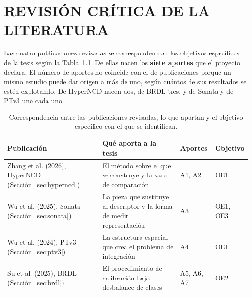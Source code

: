 
\chapter{REVISIÓN CRÍTICA DE LA LITERATURA}
\label{cap:revision}

Las cuatro publicaciones revisadas se corresponden con los objetivos específicos
de la tesis según la Tabla~\ref{tab:mapa-estudios}. De ellas nacen los
\textbf{siete aportes} que el proyecto declara. El número de aportes no coincide
con el de publicaciones porque un mismo estudio puede dar origen a más de uno,
según cuántos de sus resultados se estén explotando. De HyperNCD nacen dos, de
BRDL tres, y de Sonata y de PTv3 uno cada uno.

\begin{table}[!htbp]
\centering
{}\small
\small
\caption[Publicaciones revisadas y su aporte a cada objetivo]{Correspondencia entre las publicaciones revisadas, lo que aportan y el
objetivo específico con el que se identifican.}
\label{tab:mapa-estudios}
\begin{tabularx}{\linewidth}{@{}>{\raggedright\arraybackslash\hsize=0.88\hsize}X>{\raggedright\arraybackslash\hsize=1.12\hsize}Xll@{}}
\hline
\textbf{Publicación} & \textbf{Qué aporta a la tesis} & \textbf{Aportes} &
\textbf{Objetivo} \\
\hline
Zhang et al. (2026), HyperNCD \newline (Sección~\ref{sec:hyperncd})
& El método sobre el que se construye y la vara de comparación
& A1, A2 & OE1 \\
Wu et al. (2025), Sonata \newline (Sección~\ref{sec:sonata})
& La pieza que sustituye al descriptor y la forma de medir representación
& A3 & OE1, OE3 \\
Wu et al. (2024), PTv3 \newline (Sección~\ref{sec:ptv3})
& La estructura espacial que crea el problema de integración
& A4 & OE1 \\
Su et al. (2025), BRDL \newline (Sección~\ref{sec:brdl})
& El procedimiento de calibración bajo desbalance de clases
& A5, A6, A7 & OE2 \\
\hline
\end{tabularx}
\end{table}

